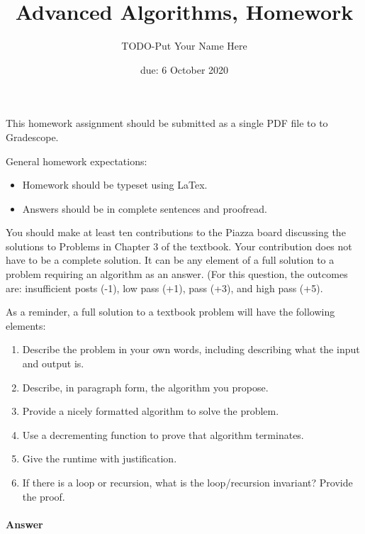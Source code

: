 \documentclass{article}
\title{Advanced Algorithms, Homework \hwnum}
\author{TODO-Put Your Name Here}
\date{due: 6 October 2020}
\begin{document}
\maketitle

This homework assignment should be
submitted as a single PDF file to to Gradescope.

General homework expectations:
\begin{itemize}
    \item Homework should be typeset using LaTex.
    \item Answers should be in complete sentences and proofread.
\end{itemize}

\nextprob
{}

You should make at least ten contributions to the Piazza board
discussing the solutions to Problems in Chapter 3 of the textbook.  Your
contribution does not have to be a complete solution.  It can be any element of
a full solution to a problem requiring an algorithm as an answer.  (For this
question, the outcomes are: insufficient posts (-1), low pass (+1), pass (+3),
and high pass (+5).

As a reminder, a full solution to a textbook problem will have the following elements:
\begin{enumerate}
    \item Describe the problem in your own words, including
        describing what the input and output is.
    \item Describe, in paragraph form, the algorithm you propose.
    \item Provide a nicely formatted algorithm to solve the problem.
    \item Use a decrementing function to prove that algorithm terminates.
    \item Give the runtime with justification.
    \item If there is a loop or recursion, what is the loop/recursion invariant? Provide the proof.
\end{enumerate}

\paragraph{Answer}

\end{document}
